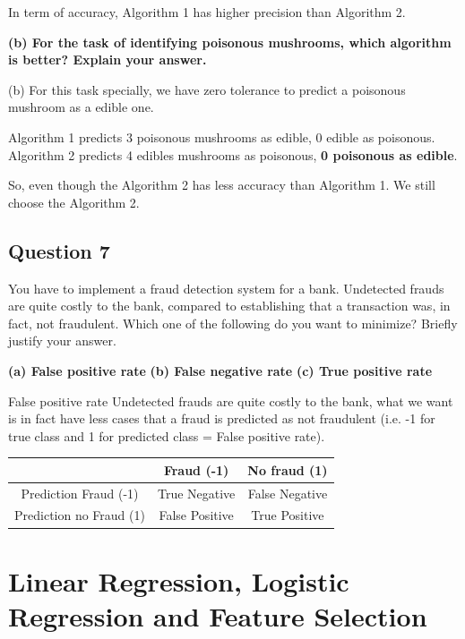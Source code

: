 \documentclass{article}
\begin{document}
In term of accuracy, Algorithm 1 has higher precision than Algorithm 2.

\vspace{1em}
{\bf (b) For the task of identifying poisonous mushrooms, which algorithm is better? Explain your answer.}


(b) For this task specially, we have zero tolerance to predict a poisonous mushroom as a edible one. 

Algorithm 1 predicts 3 poisonous mushrooms as edible, 0 edible as poisonous. Algorithm 2 predicts 4 edibles mushrooms as poisonous, \textbf{0 poisonous as edible}.

So, even though the Algorithm 2 has less accuracy than Algorithm 1. We still choose the Algorithm 2.



\newpage
\subsection{Question 7}

You have to implement a fraud detection system for a bank. Undetected frauds are quite costly to the bank, compared to establishing that a transaction was, in fact, not fraudulent. Which one of the following do you want to minimize? Briefly justify your answer.

{\bf (a) False positive rate}
\vspace{1em}
{\bf (b) False negative rate}
\vspace{1em}
{\bf (c) True positive rate}

False positive rate
Undetected frauds are quite costly to the bank, what we want is in fact have less cases that a fraud is predicted as not fraudulent (i.e. -1 for true class and 1 for predicted class = False positive rate).

\begin{center}
\begin{tabular}{| c | c | c |}
	\hline
	 & Fraud (-1)&No fraud (1) \\  \hline  
	Prediction Fraud (-1) &True Negative&False Negative \\   \hline  
	Prediction no Fraud (1)&False Positive&True Positive\\     
	\hline
\end{tabular}
\end{center}


\newpage
\section{Linear Regression, Logistic Regression and Feature Selection}
\end{document}
